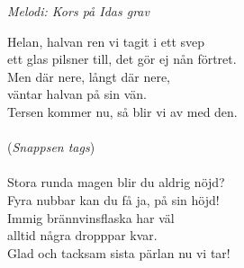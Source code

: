{\footnotesize\textit{Melodi: Kors på Idas grav}}\par
\vspace{10pt}
Helan, halvan ren vi tagit i ett svep\\
ett glas pilsner till, det gör ej nån förtret.\\
Men där nere, långt där nere,\\
väntar halvan på sin vän.\\
Tersen kommer nu, så blir vi av med den.\\
\\
(\textit{Snappsen tags})\\
\\
Stora runda magen blir du aldrig nöjd?\\
Fyra nubbar kan du få ja, på sin höjd!\\
Immig brännvinsflaska har väl\\
alltid några dropppar kvar.\\
Glad och tacksam sista pärlan nu vi tar!